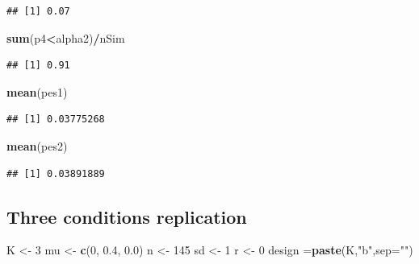 \documentclass[]{book}
\newenvironment{Shaded}{\begin{snugshade}}{\end{snugshade}}
\newcommand{\DataTypeTok}[1]{\textcolor[rgb]{0.13,0.29,0.53}{#1}}
\newcommand{\DecValTok}[1]{\textcolor[rgb]{0.00,0.00,0.81}{#1}}
\newcommand{\FloatTok}[1]{\textcolor[rgb]{0.00,0.00,0.81}{#1}}
\newcommand{\KeywordTok}[1]{\textcolor[rgb]{0.13,0.29,0.53}{\textbf{#1}}}
\newcommand{\NormalTok}[1]{#1}
\newcommand{\OperatorTok}[1]{\textcolor[rgb]{0.81,0.36,0.00}{\textbf{#1}}}
\newcommand{\StringTok}[1]{\textcolor[rgb]{0.31,0.60,0.02}{#1}}
\begin{document}
\begin{verbatim}
## [1] 0.07
\end{verbatim}

\begin{Shaded}
\begin{Highlighting}[]
\KeywordTok{sum}\NormalTok{(p4}\OperatorTok{<}\NormalTok{alpha2)}\OperatorTok{/}\NormalTok{nSim}
\end{Highlighting}
\end{Shaded}

\begin{verbatim}
## [1] 0.91
\end{verbatim}

\begin{Shaded}
\begin{Highlighting}[]
\KeywordTok{mean}\NormalTok{(pes1)}
\end{Highlighting}
\end{Shaded}

\begin{verbatim}
## [1] 0.03775268
\end{verbatim}

\begin{Shaded}
\begin{Highlighting}[]
\KeywordTok{mean}\NormalTok{(pes2)}
\end{Highlighting}
\end{Shaded}

\begin{verbatim}
## [1] 0.03891889
\end{verbatim}

\hypertarget{three-conditions-replication-1}{%
\subsection{Three conditions replication}\label{three-conditions-replication-1}}

\begin{Shaded}
\begin{Highlighting}[]
\NormalTok{K <-}\StringTok{ }\DecValTok{3}
\NormalTok{mu <-}\StringTok{ }\KeywordTok{c}\NormalTok{(}\DecValTok{0}\NormalTok{, }\FloatTok{0.4}\NormalTok{, }\FloatTok{0.0}\NormalTok{)}
\NormalTok{n <-}\StringTok{ }\DecValTok{145}
\NormalTok{sd <-}\StringTok{ }\DecValTok{1}
\NormalTok{r <-}\StringTok{ }\DecValTok{0}
\NormalTok{design =}\KeywordTok{paste}\NormalTok{(K,}\StringTok{"b"}\NormalTok{,}\DataTypeTok{sep=}\StringTok{""}\NormalTok{)}
\end{Highlighting}
\end{Shaded}
\end{document}
